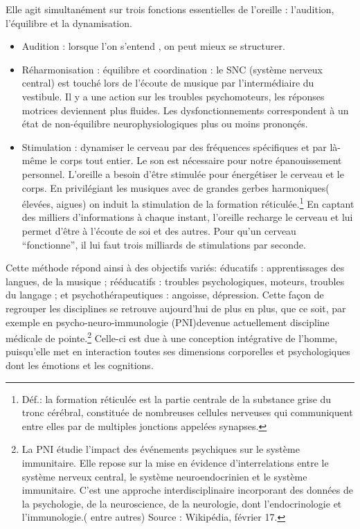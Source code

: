 Elle agit simultanément sur trois fonctions essentielles de l'oreille
: l'audition, l'équilibre et la dynamisation.
\begin{itemize}
	\item Audition : lorsque l'on s'entend , on peut mieux se structurer.
	\item Réharmonisation : équilibre et coordination : le SNC (système nerveux
		central) est touché lors de l'écoute de musique par l'intermédiaire
		du vestibule. Il y a une action sur les troubles psychomoteurs, les
		réponses motrices deviennent plus fluides. Les dysfonctionnements
		correspondent à un état de non-équilibre neurophysiologiques plus
		ou moins prononçés. 
	\item Stimulation : dynamiser le cerveau par des fréquences spécifiques
		et par là-même le corps tout entier. Le son est nécessaire pour notre
		épanouissement personnel. L'oreille a besoin d'être stimulée pour
		énergétiser le cerveau et le corps. En privilégiant les musiques avec
		de grandes gerbes harmoniques( élevées, aigues) on induit la stimulation
		de la formation réticulée.\footnote{Déf.: la formation réticulée est la partie centrale de la substance grise du tronc cérébral, constituée de nombreuses cellules nerveuses qui communiquent entre elles par de multiples jonctions appelées synapses.} En captant des milliers d'informations
		à chaque instant, l'oreille recharge le cerveau et lui permet d'être
		à l'écoute de soi et des autres. Pour qu'un cerveau ``fonctionne'',
		il lui faut trois milliards de stimulations par seconde.
\end{itemize}



Cette méthode répond ainsi à des objectifs variés: éducatifs : apprentissages
des langues, de la musique ; rééducatifs : troubles psychologiques,
moteurs, troubles du langage ; et psychothérapeutiques : angoisse,
dépression. Cette façon de regrouper les disciplines se retrouve
aujourd'hui de plus en plus, que ce soit, par exemple en psycho-neuro-immunologie
(PNI)devenue actuellement discipline médicale de pointe.\footnote{La PNI étudie l'impact des événements psychiques sur le système immunitaire. Elle repose sur la mise en évidence d'interrelations entre le système
nerveux central, le système neuroendocrinien et le système immunitaire.
C'est une approche interdisciplinaire incorporant des données de la
psychologie, de la neuroscience, de la neurologie, dont l'endocrinologie
et l'immunologie.( entre autres) Source : Wikipédia, février 17.}
Celle-ci est due à une conception intégrative
de l'homme, puisqu'elle met en interaction toutes ses dimensions corporelles
et psychologiques dont 
les émotions et les cognitions.






